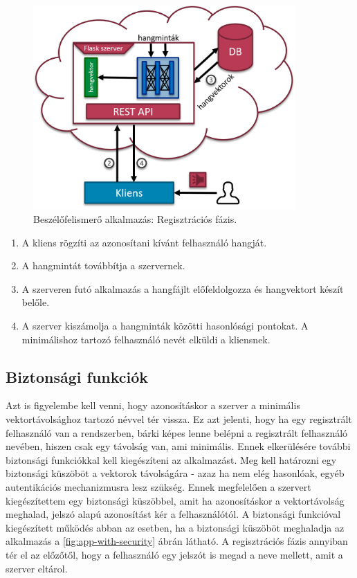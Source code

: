 \begin{figure}[!ht]
	\centering
	\includegraphics[width=100mm, keepaspectratio]{figures/app-identify.png}
	\caption{Beszélőfelismerő alkalmazás: Regisztrációs fázis.}
	\label{fig:app-identify}
\end{figure}

\begin{enumerate}
	\item A kliens rögzíti az azonosítani kívánt felhasználó hangját.
	\item A hangmintát továbbítja a szervernek.
	\item A szerveren futó alkalmazás a hangfájlt előfeldolgozza és hangvektort készít belőle.
	\item A szerver kiszámolja a hangminták közötti hasonlósági pontokat. A minimálishoz tartozó felhasználó nevét elküldi a kliensnek.
\end{enumerate}

\subsection{Biztonsági funkciók}

Azt is figyelembe kell venni, hogy azonosításkor a szerver a minimális vektortávolsághoz tartozó névvel tér vissza. Ez azt jelenti, hogy ha egy regisztrált felhasználó van a rendszerben,
bárki képes lenne belépni a regisztrált felhasználó nevében, hiszen csak egy távolság van, ami minimális. Ennek elkerülésére további biztonsági funkciókkal kell kiegészíteni az alkalmazást.
\newline
\newline
Meg kell határozni egy biztonsági küszöböt a vektorok távolságára - azaz ha nem elég hasonlóak, egyéb autentikációs mechanizmusra lesz szükség. Ennek megfelelően a szervert
kiegészítettem egy biztonsági küszöbbel, amit ha azonosításkor a vektortávolság meghalad, jelszó alapú azonosítást kér a felhasználótól. A biztonsági funkcióval kiegészített
működés abban az esetben, ha a biztonsági küszöböt meghaladja az alkalmazás a \ref{fig:app-with-security} ábrán látható. A regisztrációs fázis annyiban tér el az előzőtől, hogy a felhasználó egy jelszót is megad a neve mellett, amit
a szerver eltárol.

